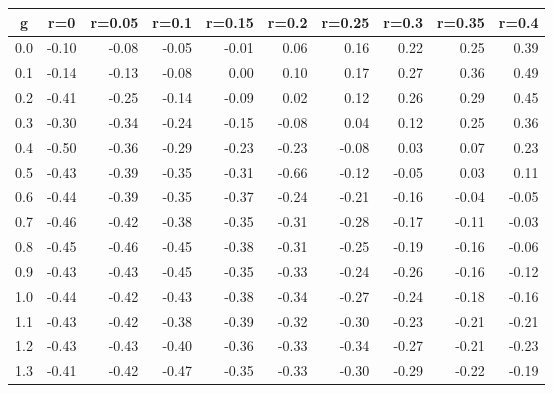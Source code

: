 %
\begin{table}[!tbp]
 \begin{center}
 \begin{tabular}{rrrrrrrrrr}\hline\hline
\multicolumn{1}{c}{g}&\multicolumn{1}{c}{r=0}&\multicolumn{1}{c}{r=0.05}&\multicolumn{1}{c}{r=0.1}&\multicolumn{1}{c}{r=0.15}&\multicolumn{1}{c}{r=0.2}&\multicolumn{1}{c}{r=0.25}&\multicolumn{1}{c}{r=0.3}&\multicolumn{1}{c}{r=0.35}&\multicolumn{1}{c}{r=0.4}\tabularnewline
\hline
0.0&-0.10&-0.08&-0.05&-0.01& 0.06& 0.16& 0.22& 0.25& 0.39\tabularnewline
0.1&-0.14&-0.13&-0.08& 0.00& 0.10& 0.17& 0.27& 0.36& 0.49\tabularnewline
0.2&-0.41&-0.25&-0.14&-0.09& 0.02& 0.12& 0.26& 0.29& 0.45\tabularnewline
0.3&-0.30&-0.34&-0.24&-0.15&-0.08& 0.04& 0.12& 0.25& 0.36\tabularnewline
0.4&-0.50&-0.36&-0.29&-0.23&-0.23&-0.08& 0.03& 0.07& 0.23\tabularnewline
0.5&-0.43&-0.39&-0.35&-0.31&-0.66&-0.12&-0.05& 0.03& 0.11\tabularnewline
0.6&-0.44&-0.39&-0.35&-0.37&-0.24&-0.21&-0.16&-0.04&-0.05\tabularnewline
0.7&-0.46&-0.42&-0.38&-0.35&-0.31&-0.28&-0.17&-0.11&-0.03\tabularnewline
0.8&-0.45&-0.46&-0.45&-0.38&-0.31&-0.25&-0.19&-0.16&-0.06\tabularnewline
0.9&-0.43&-0.43&-0.45&-0.35&-0.33&-0.24&-0.26&-0.16&-0.12\tabularnewline
1.0&-0.44&-0.42&-0.43&-0.38&-0.34&-0.27&-0.24&-0.18&-0.16\tabularnewline
1.1&-0.43&-0.42&-0.38&-0.39&-0.32&-0.30&-0.23&-0.21&-0.21\tabularnewline
1.2&-0.43&-0.43&-0.40&-0.36&-0.33&-0.34&-0.27&-0.21&-0.23\tabularnewline
1.3&-0.41&-0.42&-0.47&-0.35&-0.33&-0.30&-0.29&-0.22&-0.19\tabularnewline
\hline
\end{tabular}

\end{center}

\end{table}


